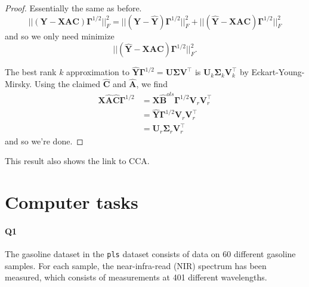 \documentclass[
]{book}
\newenvironment{Shaded}{\begin{snugshade}}{\end{snugshade}}
\newcommand{\AttributeTok}[1]{\textcolor[rgb]{0.77,0.63,0.00}{#1}}
\newcommand{\DecValTok}[1]{\textcolor[rgb]{0.00,0.00,0.81}{#1}}
\newcommand{\FunctionTok}[1]{\textcolor[rgb]{0.00,0.00,0.00}{#1}}
\newcommand{\NormalTok}[1]{#1}
\newcommand{\SpecialCharTok}[1]{\textcolor[rgb]{0.00,0.00,0.00}{#1}}
\newcommand{\StringTok}[1]{\textcolor[rgb]{0.31,0.60,0.02}{#1}}
\theoremstyle{definition}
\theoremstyle{definition}
\theoremstyle{definition}
\theoremstyle{definition}
\theoremstyle{remark}
\begin{document}
\begin{proof}
Essentially the same as before.
\[  ||(\mathbf Y-\mathbf X\mathbf A\mathbf C)\boldsymbol \Gamma^{1/2}||_F^2 = ||(\mathbf Y-\hat{\mathbf Y})\boldsymbol \Gamma^{1/2}||_F^2+||(\hat{\mathbf Y}-\mathbf X\mathbf A\mathbf C)\boldsymbol \Gamma^{1/2}||_F^2\]
and so we only need minimize \[||(\hat{\mathbf Y}-\mathbf X\mathbf A\mathbf C)\boldsymbol \Gamma^{1/2}||_F^2.\]

The best rank \(k\) approximation to \(\hat{\mathbf Y}\boldsymbol \Gamma^{1/2} = \mathbf U\boldsymbol{\Sigma}\mathbf V^\top\) is
\(\mathbf U_k \boldsymbol{\Sigma}_k \mathbf V_k^\top\) by Eckart-Young-Mirsky.
Using the claimed \(\hat{\mathbf C}\) and \(\hat{\mathbf A}\), we find
\begin{align*}
\mathbf X\hat{\mathbf A}\hat{\mathbf C} \boldsymbol \Gamma^{1/2}&= \mathbf X\hat{\mathbf B}^{ols}\boldsymbol \Gamma^{1/2}\mathbf V_r\mathbf V_r^\top\\
&= \hat{\mathbf Y}\boldsymbol \Gamma^{1/2}\mathbf V_r \mathbf V_r^\top\\
&=\mathbf U_r \boldsymbol{\Sigma}_r \mathbf V_r^\top
\end{align*}
and so we're done.
\end{proof}

This result also shows the link to CCA.

\hypertarget{computer-tasks-6}{%
\section{Computer tasks}\label{computer-tasks-6}}

\hypertarget{q1-1}{%
\paragraph*{Q1}\label{q1-1}}

The gasoline dataset in the \texttt{pls} dataset consists of data on 60 different gasoline samples. For each sample, the near-infra-read (NIR) spectrum has been measured, which consists of measurements at 401 different wavelengths.

\begin{Shaded}
\end{Shaded}
\end{document}
